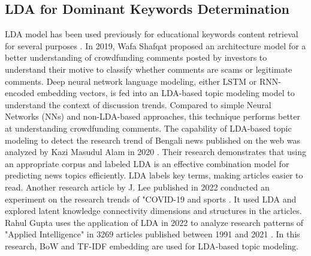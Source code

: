 \documentclass[sn-mathphys,Numbered]{sn-jnl}%
\theoremstyle{thmstyleone}%
\theoremstyle{thmstyletwo}%
\theoremstyle{thmstylethree}%
\begin{document}
\subsection{LDA for Dominant Keywords Determination}\label{dom_lda} 
LDA model has been used previously for educational keywords content retrieval for several purposes \cite{chen2020detecting, gencoglu2023machine, paek2021exploring, molavi2020extracting}. In 2019, Wafa Shafqat \cite{shafqat2019topic} proposed an architecture model for a better understanding of crowdfunding comments posted by investors to understand their motive to classify whether comments are scams or legitimate comments. Deep neural network language modeling, either LSTM or RNN-encoded embedding vectors, is fed into an LDA-based topic modeling model to understand the context of discussion trends. Compared to simple Neural Networks (NNs) and non-LDA-based approaches, this technique performs better at understanding crowdfunding comments. The capability of LDA-based topic modeling to detect the research trend of Bengali news published on the web was analyzed by Kazi Masudul Alam in 2020 \cite{alam_bangla_2020}. Their research demonstrates that using an appropriate corpus and labeled LDA is an effective combination model for predicting news topics efficiently. LDA labels key terms, making articles easier to read. Another research article by J. Lee published in 2022 conducted an experiment on the research trends of "COVID-19 and sports \cite{lee_lda_based_2022}. It used LDA and explored latent knowledge connectivity dimensions and structures in the articles. Rahul Gupta uses the application of LDA in 2022 to analyze research patterns of "Applied Intelligence" in 3269 articles published between 1991 and 2021 \cite{gupta_prediction_2022}. In this research, BoW and TF-IDF embedding are used for LDA-based topic modeling.\\
\end{document}
